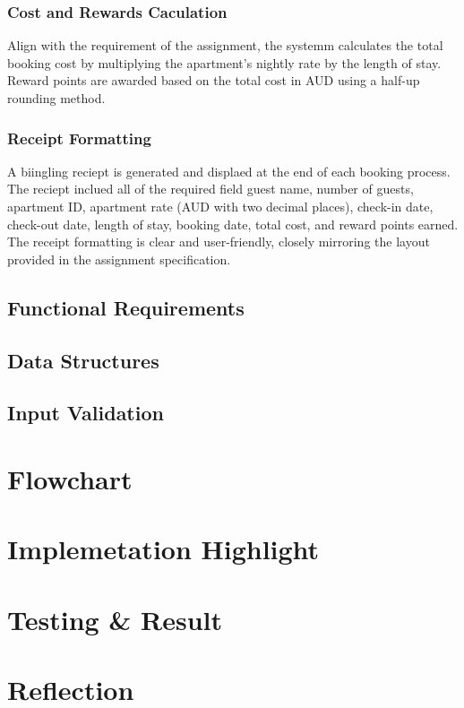 \documentclass[conference]{IEEEtran}
\begin{document}
\subsubsection{Cost and Rewards Caculation}
Align with the requirement of the assignment, the systemm calculates the total booking cost by multiplying the apartment's nightly rate by the length of stay. Reward points are awarded based on the total cost in AUD using a half-up rounding method.
\subsubsection{Receipt Formatting}
A biingling reciept is generated and displaed at the end of each booking process. The reciept inclued all of the required field  guest name, number of guests, apartment ID, apartment rate (AUD with two decimal places), check-in date, check-out date, length of stay, booking date, total cost, and reward points earned. The receipt formatting is clear and user-friendly, closely mirroring the layout provided in the assignment specification.
\subsection{Functional Requirements}

\subsection{Data Structures}

\subsection{Input Validation}

\section{Flowchart}

\section{Implemetation Highlight}

\section{Testing \& Result}

\section{Reflection}
\end{document}
